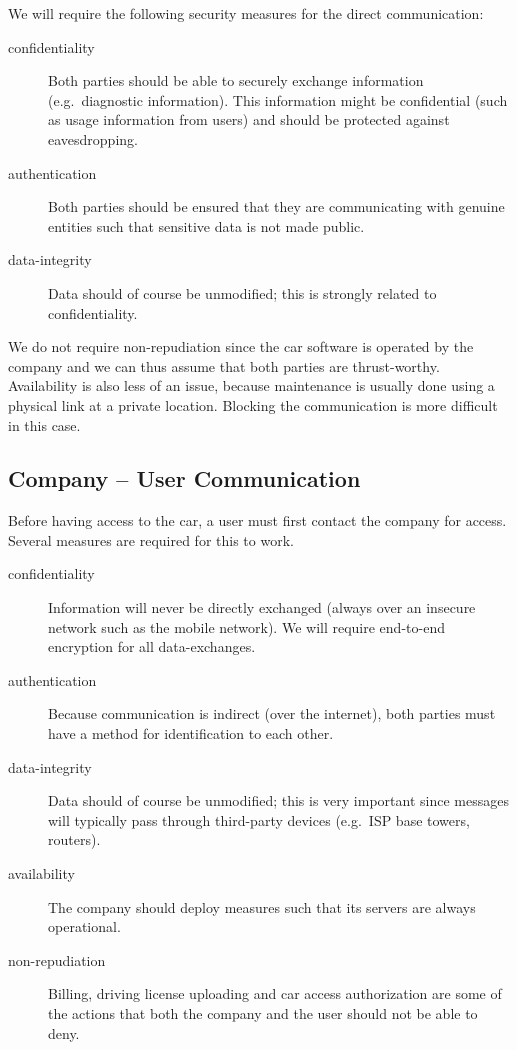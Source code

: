 We will require the following security measures for the direct communication:

\begin{description}
  \item[confidentiality] Both parties should be able to securely exchange information (e.g.\ diagnostic information). This information might be confidential (such as usage information from users) and should be protected against eavesdropping.
  \item[authentication] Both parties should be ensured that they are communicating with genuine entities such that sensitive data is not made public.
  \item[data-integrity] Data should of course be unmodified; this is strongly related to confidentiality.
\end{description}

We do not require non-repudiation since the car software is operated by the company and we can thus assume that both parties are thrust-worthy. Availability is also less of an issue, because maintenance is usually done using a physical link at a private location. Blocking the communication is more difficult in this case.

\subsection{Company -- User Communication}

Before having access to the car, a user must first contact the company for access. Several measures are required for this to work.

\begin{description}
  \item[confidentiality] Information will never be directly exchanged (always over an insecure network such as the mobile network). We will require end-to-end encryption for all data-exchanges.
  \item[authentication] Because communication is indirect (over the internet), both parties must have a method for identification to each other.
  \item[data-integrity] Data should of course be unmodified; this is very important since messages will typically pass through third-party devices (e.g.\ ISP base towers, routers).
  \item[availability] The company should deploy measures such that its servers are always operational.
  \item[non-repudiation] Billing, driving license uploading and car access authorization are some of the actions that both the company and the user should not be able to deny.
\end{description}

